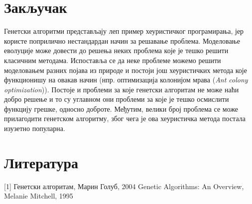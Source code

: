 \documentclass{article}
\begin{document}
\section{Закључак}
Генетски алгоритми представљају леп пример хеуристичког програмирања, јер користе поприлично
нестандардан начин за решавање проблема. Моделовање еволуције може довести до решења неких проблема 
које је тешко решити класичним методама. Испоставља се да неке проблеме можемо решити моделовањем 
разних појава из природе и постоји још хеуристичких метода које функционишу на овакав начин
(нпр. оптимизација колонијом мрава (\textit{Ant colony optimization})). Постоје и проблеми за које
генетски алгоритам не може наћи добро решење и то су углавном они проблеми за које је тешко осмислити 
функцију грешке, односно доброте. Међутим, велики број проблема се може прилагодити генетском
алгоритму, због чега је ова хеуристичка метода постала изузетно популарна.


\section{Литература}
[1] Генетски алгоритам, Марин Голуб, 2004 \newline
[2] Genetic Algorithms: An Overview, Melanie Mitchell, 1995 \newline
[3]
\end{document}
